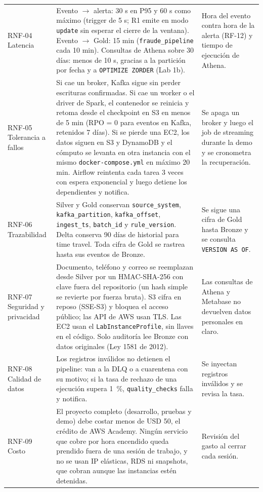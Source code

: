 \documentclass[12pt,letterpaper]{article}
\newcommand{\code}[1]{{\small\texttt{#1}}}
\begin{document}
\begin{footnotesize}
\begin{longtable}{@{}P{0.8in}P{3.95in}P{1.7in}@{}}
RNF-04 Latencia & Evento $\rightarrow$ alerta: 30 s en P95 y 60 s como máximo (trigger de 5 s; R1 emite en modo \code{update} sin esperar el cierre de la ventana). Evento $\rightarrow$ Gold: 15 min (\code{fraude\_pipeline} cada 10 min). Consultas de Athena sobre 30 días: menos de 10 s, gracias a la partición por fecha y a \code{OPTIMIZE ZORDER} (Lab 1b). & Hora del evento contra hora de la alerta (RF-12) y tiempo de ejecución de Athena.\\[1pt]
RNF-05 Tolerancia a fallos & Si cae un broker, Kafka sigue sin perder escrituras confirmadas. Si cae un worker o el driver de Spark, el contenedor se reinicia y retoma desde el checkpoint en S3 en menos de 5 min (RPO = 0 para eventos en Kafka, retenidos 7 días). Si se pierde una EC2, los datos siguen en S3 y DynamoDB y el cómputo se levanta en otra instancia con el mismo \code{docker-compose.yml} en máximo 20 min. Airflow reintenta cada tarea 3 veces con espera exponencial y luego detiene los dependientes y notifica. & Se apaga un broker y luego el job de streaming durante la demo y se cronometra la recuperación.\\[1pt]
RNF-06 Trazabilidad & Silver y Gold conservan \code{source\_system}, \code{kafka\_partition}, \code{kafka\_offset}, \code{ingest\_ts}, \code{batch\_id} y \code{rule\_version}. Delta conserva 90 días de historial para time travel. Toda cifra de Gold se rastrea hasta sus eventos de Bronze. & Se sigue una cifra de Gold hasta Bronze y se consulta \code{VERSION AS OF}.\\[1pt]
RNF-07 Seguridad y privacidad & Documento, teléfono y correo se reemplazan desde Silver por un HMAC-SHA-256 con clave fuera del repositorio (un hash simple se revierte por fuerza bruta). S3 cifra en reposo (SSE-S3) y bloquea el acceso público; las API de AWS usan TLS. Las EC2 usan el \code{LabInstanceProfile}, sin llaves en el código. Solo auditoría lee Bronze con datos originales (Ley 1581 de 2012). & Las consultas de Athena y Metabase no devuelven datos personales en claro.\\[1pt]
RNF-08 Calidad de datos & Los registros inválidos no detienen el pipeline: van a la DLQ o a cuarentena con su motivo; si la tasa de rechazo de una ejecución supera 1~\%, \code{quality\_checks} falla y notifica. & Se inyectan registros inválidos y se revisa la tasa.\\[1pt]
RNF-09 Costo & El proyecto completo (desarrollo, pruebas y demo) debe costar menos de USD 50, el crédito de AWS Academy. Ningún servicio que cobre por hora encendido queda prendido fuera de una sesión de trabajo, y no se usan IP elásticas, RDS ni snapshots, que cobran aunque las instancias estén detenidas. & Revisión del gasto al cerrar cada sesión.\\
\end{longtable}
\end{footnotesize}
\end{document}
